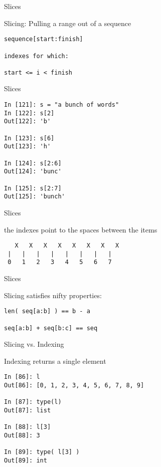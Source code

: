 \documentclass{beamer}
\begin{document}
\begin{frame}[fragile]{Slices}

{\Large Slicing: Pulling a range out of a sequence}

\begin{verbatim}
sequence[start:finish]  

indexes for which:

start <= i < finish
\end{verbatim}

\end{frame}

\begin{frame}[fragile]{Slices}
\begin{verbatim}
In [121]: s = "a bunch of words"
In [122]: s[2]
Out[122]: 'b'

In [123]: s[6]
Out[123]: 'h'

In [124]: s[2:6]
Out[124]: 'bunc'

In [125]: s[2:7]
Out[125]: 'bunch'
\end{verbatim}

\end{frame}


\begin{frame}[fragile]{Slices}

{\Large the indexes point to the spaces between the items}

\vfill
\begin{verbatim}
   X   X   X   X   X   X   X   X
 |   |   |   |   |   |   |   | 
 0   1   2   3   4   5   6   7
\end{verbatim}

\end{frame}

\begin{frame}[fragile]{Slices}

{\Large Slicing satisfies nifty properties:

\vfill
\begin{verbatim}
len( seq[a:b] ) == b - a

seq[a:b] + seq[b:c] == seq

\end{verbatim}

}

\end{frame}

\begin{frame}[fragile]{Slicing vs. Indexing}

{\Large Indexing returns a single element}

\begin{verbatim}
In [86]: l
Out[86]: [0, 1, 2, 3, 4, 5, 6, 7, 8, 9]

In [87]: type(l)
Out[87]: list

In [88]: l[3]
Out[88]: 3

In [89]: type( l[3] )
Out[89]: int
\end{verbatim}
\end{frame}
\end{document}
